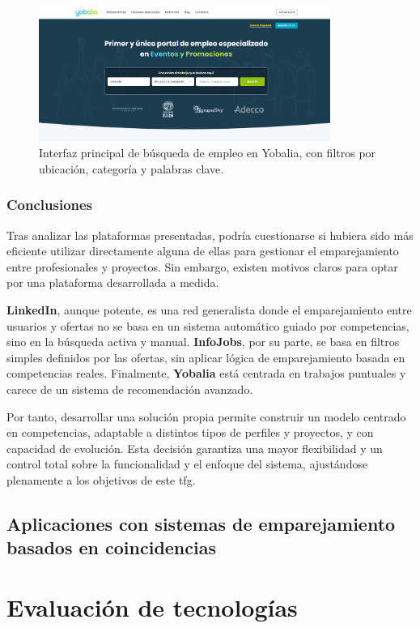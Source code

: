 \begin{figure}[H]
    \centering
    \includegraphics[width=0.85\textwidth]{figs/yobalia-portada.png}
    \caption{Interfaz principal de búsqueda de empleo en Yobalia, con filtros por ubicación, categoría y palabras clave.}
    \label{fig:yobalia-portada}
\end{figure}

\subsubsection{Conclusiones}

Tras analizar las plataformas presentadas, podría cuestionarse si hubiera sido más
eficiente utilizar directamente alguna de ellas para gestionar el emparejamiento entre
profesionales y proyectos. Sin embargo, existen motivos claros para optar por una
plataforma desarrollada a medida.

\textbf{LinkedIn}, aunque potente, es una red generalista donde el emparejamiento entre
usuarios y ofertas no se basa en un sistema automático guiado por competencias, sino en
la búsqueda activa y manual. \textbf{InfoJobs}, por su parte, se basa en filtros simples
definidos por las ofertas, sin aplicar lógica de emparejamiento basada en competencias
reales. Finalmente, \textbf{Yobalia} está centrada en trabajos puntuales y carece de un
sistema de recomendación avanzado.

Por tanto, desarrollar una solución propia permite construir un modelo centrado en
competencias, adaptable a distintos tipos de perfiles y proyectos, y con capacidad de
evolución. Esta decisión garantiza una mayor flexibilidad y un control total sobre la
funcionalidad y el enfoque del sistema, ajustándose plenamente a los objetivos de este
\gls{tfg}.

\subsection{Aplicaciones con sistemas de emparejamiento basados en coincidencias}


\section{Evaluación de tecnologías}\label{sec:evaluacion-tecnologias}
